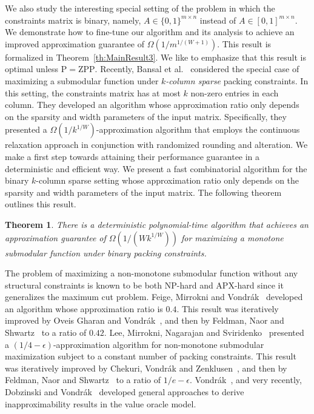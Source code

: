 \documentclass[11pt]{article}
\theoremstyle{plain}
\newtheorem{theorem}{Theorem}[section]
\theoremstyle{definition}
\begin{document}
We also study the interesting special setting of the problem in
which the constraints matrix is binary, namely, $A \in \{0,1\}^{m
\times n}$ instead of $A \in [0,1]^{m \times n}$. We demonstrate
how to fine-tune our algorithm and its analysis to achieve an
improved approximation guarantee of $\Omega(1 / m^{1/(W+1)})$.
This result is formalized in Theorem~\ref{th:MainResult3}. We like
to emphasize that this result is optimal unless $\mathrm{P} =
\mathrm{ZPP}$. Recently, Bansal et al.~\cite{BansalKNS10}
considered the special case of maximizing a submodular function
under $k$\emph{-column sparse} packing constraints. In this
setting, the constraints matrix has at most $k$ non-zero entries
in each column. They developed an algorithm whose approximation
ratio only depends on the sparsity and width parameters of the
input matrix. Specifically, they presented a $\Omega(1 /
k^{1/W})$-approximation algorithm that employs the continuous
relaxation approach in conjunction with randomized rounding and
alteration. We make a first step towards attaining their
performance guarantee in a deterministic and efficient way. We
present a fast combinatorial algorithm for the binary $k$-column
sparse setting whose approximation ratio only depends on the
sparsity and width parameters of the input matrix. The following
theorem outlines this result.

\begin{theorem} \label{th:MainResult4}
There is a deterministic polynomial-time algorithm that achieves
an approximation guarantee of $\Omega(1 / (W k^{1/W}))$ for
maximizing a monotone submodular function under binary packing
constraints.
\end{theorem}


\medskip {}
The problem of maximizing a non-monotone submodular function
without any structural constraints is known to be both NP-hard and
APX-hard since it generalizes the maximum cut problem. Feige,
Mirrokni and Vondr{\'a}k~\cite{FeigeMV07} developed an algorithm
whose approximation ratio is $0.4$. This result was iteratively
improved by Oveis Gharan and Vondr{\'a}k~\cite{GharanV11}, and
then by Feldman, Naor and Shwartz~\cite{FeldmanNS11b} to a ratio
of $0.42$. Lee, Mirrokni, Nagarajan and Sviridenko~\cite{LeeMNS10}
presented a $(1/4-\epsilon)$-approximation algorithm for
non-monotone submodular maximization subject to a constant number
of packing constraints. This result was iteratively improved by
Chekuri, Vondr{\'a}k and Zenklusen~\cite{ChekuriVZ11}, and then by
Feldman, Naor and Shwartz~\cite{FeldmanNS11a} to a ratio of
$1/e-\epsilon$. Vondr{\'a}k~\cite{Vondrak09}, and very recently,
Dobzinski and Vondr{\'a}k~\cite{DobzinskiV12} developed general
approaches to derive inapproximability results in the value oracle
model.
\end{document}

